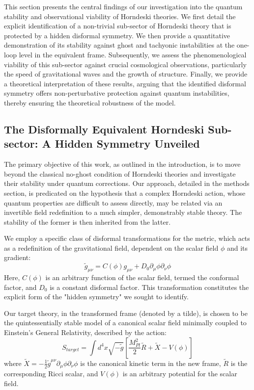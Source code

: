 \documentclass[twocolumn]{aastex631}
\begin{document}
This section presents the central findings of our investigation into the quantum stability and observational viability of Horndeski theories. We first detail the explicit identification of a non-trivial sub-sector of Horndeski theory that is protected by a hidden disformal symmetry. We then provide a quantitative demonstration of its stability against ghost and tachyonic instabilities at the one-loop level in the equivalent frame. Subsequently, we assess the phenomenological viability of this sub-sector against crucial cosmological observations, particularly the speed of gravitational waves and the growth of structure. Finally, we provide a theoretical interpretation of these results, arguing that the identified disformal symmetry offers non-perturbative protection against quantum instabilities, thereby ensuring the theoretical robustness of the model.

\subsection{The Disformally Equivalent Horndeski Sub-sector: A Hidden Symmetry Unveiled}

The primary objective of this work, as outlined in the introduction, is to move beyond the classical no-ghost condition of Horndeski theories and investigate their stability under quantum corrections. Our approach, detailed in the methods section, is predicated on the hypothesis that a complex Horndeski action, whose quantum properties are difficult to assess directly, may be related via an invertible field redefinition to a much simpler, demonstrably stable theory. The stability of the former is then inherited from the latter.

We employ a specific class of disformal transformations for the metric, which acts as a redefinition of the gravitational field, dependent on the scalar field $\phi$ and its gradient:
\begin{equation}
\tilde{g}_{\mu\nu} = C(\phi) g_{\mu\nu} + D_0 \partial_\mu\phi \partial_\nu\phi
\end{equation}
Here, $C(\phi)$ is an arbitrary function of the scalar field, termed the conformal factor, and $D_0$ is a constant disformal factor. This transformation constitutes the explicit form of the "hidden symmetry" we sought to identify.

Our target theory, in the transformed frame (denoted by a tilde), is chosen to be the quintessentially stable model of a canonical scalar field minimally coupled to Einstein's General Relativity, described by the action:
\begin{equation}
S_{target} = \int d^4x \sqrt{-\tilde{g}} \left[ \frac{M_{Pl}^2}{2} \tilde{R} + \tilde{X} - V(\phi) \right]
\end{equation}
where $\tilde{X} = -\frac{1}{2} \tilde{g}^{\mu\nu} \partial_\mu \phi \partial_\nu \phi$ is the canonical kinetic term in the new frame, $\tilde{R}$ is the corresponding Ricci scalar, and $V(\phi)$ is an arbitrary potential for the scalar field.
\end{document}
